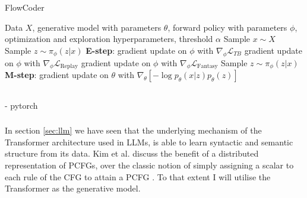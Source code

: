 \begin{algorithm}[H]
    \caption{FlowCoder}
    \begin{algorithmic}[1]
    \Require Data $X$, generative model with parameters $\theta$, forward policy with parameters $\phi$, optimization and exploration hyperparameters, threshold $\alpha$
    \Repeat
        \State Sample $x \sim X$
        \State Sample $z \sim \pi_\phi(z|x)$
        \State \textbf{E-step}: gradient update on $\phi$ with $\nabla_\phi \mathcal{L}_{TB}$
            \State gradient update on $\phi$ with $\nabla_\phi\mathcal{L}_{\text{Replay}}$
        \EndIf
            \State gradient update on $\phi$ with $\nabla_\phi\mathcal{L}_{\text{Fantasy}}$
        \EndIf
            \State Sample $z \sim \pi_\phi(z|x)$
            \State \textbf{M-step}: gradient update on $\theta$ with $\nabla_\theta[-\log p_\theta(x|z)p_\theta(z)]$
        \EndIf
    \end{algorithmic}
    \label{alg:flowcoder}
    \end{algorithm}







\subsection{}























- pytorch

\subsubsection{}
In section \ref{sec:llm} we have seen that the underlying mechanism of the Transformer architecture used in LLMs, is able to learn syntactic and semantic structure from its data.
Kim et al. discuss the benefit of a distributed representation of PCFGs, over the classic notion of simply assigning a scalar to each rule of the CFG to attain a PCFG  \cite{kim_compound_2019}. To that extent I will utilise the Transformer as the generative model.

